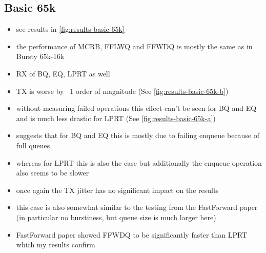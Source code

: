 \subsection{Basic 65k}
\begin{itemize}
    \item see results in \autoref{fig:results-basic-65k}
    \item the performance of MCRB, FFLWQ and FFWDQ is mostly the same as in Bursty 65k-16k
    \item RX of BQ, EQ, LPRT as well
    \item TX is worse by ~1 order of magnitude (See \autoref{fig:results-basic-65k-b})
    \item without measuring failed operations this effect can't be seen for BQ and EQ and is much less
        drastic for LPRT (See \autoref{fig:results-basic-65k-a})
    \item suggests that for BQ and EQ this is mostly due to failing enqueue because of full queues
    \item whereas for LPRT this is also the case but additionally the enqueue operation also seems to be slower
    \item once again the TX jitter has no significant impact on the results
    \item this case is also somewhat similar to the testing from the FastForward paper (in particular no
        burstiness, but queue size is much larger here)
    \item FastForward paper showed FFWDQ to be significantly faster than LPRT which my results confirm
\end{itemize}
